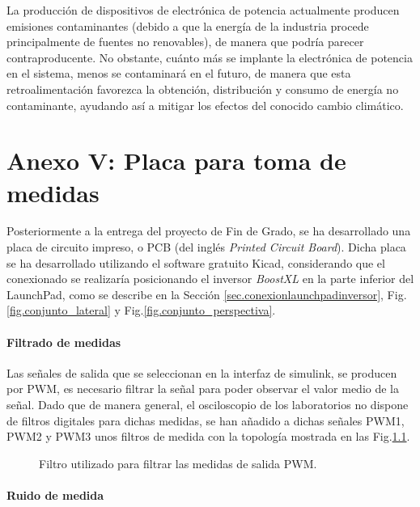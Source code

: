 \documentclass{report}
\begin{document}
La producción de dispositivos de electrónica de potencia actualmente producen emisiones contaminantes (debido a que la energía de la industria procede principalmente de fuentes no renovables), de manera que podría parecer contraproducente. No obstante, cuánto más se implante la electrónica de potencia en el sistema, menos se contaminará en el futuro, de manera que esta retroalimentación favorezca la obtención, distribución y consumo de energía no contaminante, ayudando así a mitigar los efectos del conocido cambio climático.


\chapter{Anexo V: Placa para toma de medidas} \label{sec.pcb}

Posteriormente a la entrega del proyecto de Fin de Grado, se ha desarrollado una placa de circuito impreso, o PCB (del inglés \textit{Printed Circuit Board}).
Dicha placa se ha desarrollado utilizando el software gratuito Kicad, considerando que el conexionado se realizaría posicionando el inversor \textit{BoostXL} en la parte inferior del LaunchPad, como se describe en la Sección \ref{sec.conexionlaunchpadinversor}, Fig.\ref{fig.conjunto_lateral} y Fig.\ref{fig.conjunto_perspectiva}.
\subsubsection*{Filtrado de medidas}
Las señales de salida que se seleccionan en la interfaz de simulink, se producen por PWM, es necesario filtrar la señal para poder observar el valor medio de la señal. Dado que de manera general, el osciloscopio de los laboratorios no dispone de filtros digitales para dichas medidas, se han añadido a dichas señales PWM1, PWM2 y PWM3 unos filtros de medida con la topología mostrada en las Fig.\ref{fig.filtropwm}.

\begin{figure}[!h]
    \begin{center}
        \end{center}
        \caption{Filtro utilizado para filtrar las medidas de salida PWM.}
        \label{fig.filtropwm}
\end{figure}
\subsubsection*{Ruido de medida}
\end{document}
